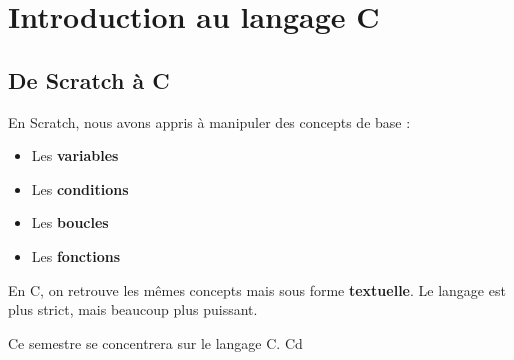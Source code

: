 
\section{Introduction au langage C}

\subsection{De Scratch à C}

En Scratch, nous avons appris à manipuler des concepts de base :
\begin{itemize}
	\item Les \textbf{variables}
	\item Les \textbf{conditions}
	\item Les \textbf{boucles}
	\item Les \textbf{fonctions}
\end{itemize}

En C, on retrouve les mêmes concepts mais sous forme \textbf{textuelle}.
Le langage est plus strict, mais beaucoup plus puissant.

Ce semestre se concentrera sur le langage C. Cd